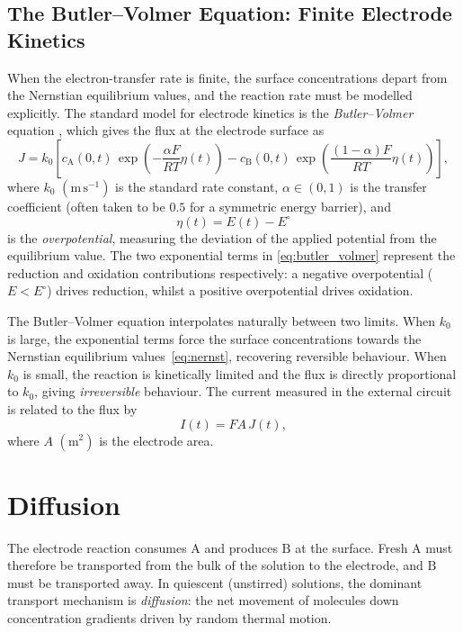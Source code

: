\subsection{The Butler--Volmer Equation: Finite Electrode Kinetics}

When the electron-transfer rate is finite, the surface concentrations
depart from the Nernstian equilibrium values, and the reaction rate must
be modelled explicitly. The standard model for electrode kinetics is the
\emph{Butler--Volmer} equation \cite{dickinson2020butler}, which
gives the flux at the electrode
surface as
\begin{equation}\label{eq:butler_volmer}
  J = k_{0}\!\left[c_{\mathrm{A}}(0,t)\,
    \exp\!\left(-\frac{\alpha F}{RT}\eta(t)\right)
    - c_{\mathrm{B}}(0,t)\,
  \exp\!\left(\frac{(1-\alpha) F}{RT}\eta(t)\right)\right],
\end{equation}
where $k_{0}$ $(\mathrm{m\,s^{-1}})$ is the standard rate constant,
$\alpha \in (0,1)$ is the transfer coefficient (often taken to be $0.5$
for a symmetric energy barrier), and
\begin{equation}
  \eta(t) = E(t) - E^{\circ}
\end{equation}
is the \emph{overpotential}, measuring the deviation of the applied
potential from the equilibrium value. The two exponential terms in
\eqref{eq:butler_volmer} represent the reduction and oxidation
contributions respectively: a negative overpotential ($E < E^{\circ}$)
drives reduction, whilst a positive overpotential drives oxidation.

The Butler--Volmer equation interpolates naturally between two limits.
When $k_{0}$ is large, the exponential terms force the surface
concentrations towards the Nernstian equilibrium values~\eqref{eq:nernst},
recovering reversible behaviour. When $k_{0}$ is small, the reaction is
kinetically limited and the flux is directly proportional to $k_{0}$,
giving \emph{irreversible} behaviour. The current measured in the external
circuit is related to the flux by
\begin{equation}
  I(t) = F A\, J(t),
\end{equation}
where $A$ $(\mathrm{m}^2)$ is the electrode area.

\section{Diffusion}\label{sec:diffusion}

The electrode reaction consumes $\mathrm{A}$ and produces $\mathrm{B}$ at
the surface. Fresh $\mathrm{A}$ must therefore be transported from the
bulk of the solution to the electrode, and $\mathrm{B}$ must be
transported away. In quiescent (unstirred) solutions, the dominant
transport mechanism is \emph{diffusion}: the net movement of molecules
down concentration gradients driven by random thermal motion.

